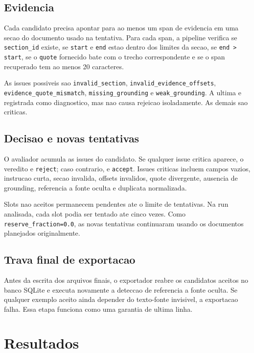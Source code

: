 \documentclass{article}
\begin{document}
\subsection{Evidencia}

Cada candidato precisa apontar para ao menos um span de evidencia em uma secao
do documento usado na tentativa. Para cada span, a pipeline verifica se
\texttt{section\_id} existe, se \texttt{start} e \texttt{end} estao dentro dos
limites da secao, se \texttt{end > start}, se o \texttt{quote} fornecido bate
com o trecho correspondente e se o span recuperado tem ao menos 20 caracteres.

As issues possiveis sao \texttt{invalid\_section},
\texttt{invalid\_evidence\_offsets}, \texttt{evidence\_quote\_mismatch},
\texttt{missing\_grounding} e \texttt{weak\_grounding}. A ultima e registrada
como diagnostico, mas nao causa rejeicao isoladamente. As demais sao criticas.

\subsection{Decisao e novas tentativas}

O avaliador acumula as issues do candidato. Se qualquer issue critica aparece,
o veredito e \texttt{reject}; caso contrario, e \texttt{accept}. Issues
criticas incluem campos vazios, instrucao curta, secao invalida, offsets
invalidos, quote divergente, ausencia de grounding, referencia a fonte oculta e
duplicata normalizada.

Slots nao aceitos permanecem pendentes ate o limite de tentativas. Na run
analisada, cada slot podia ser tentado ate cinco vezes. Como
\texttt{reserve\_fraction=0.0}, as novas tentativas continuaram usando os
documentos planejados originalmente.

\subsection{Trava final de exportacao}

Antes da escrita dos arquivos finais, o exportador reabre os candidatos aceitos
no banco SQLite e executa novamente a deteccao de referencia a fonte oculta.
Se qualquer exemplo aceito ainda depender do texto-fonte invisivel, a
exportacao falha. Essa etapa funciona como uma garantia de ultima linha.

\section{Resultados}
\end{document}
